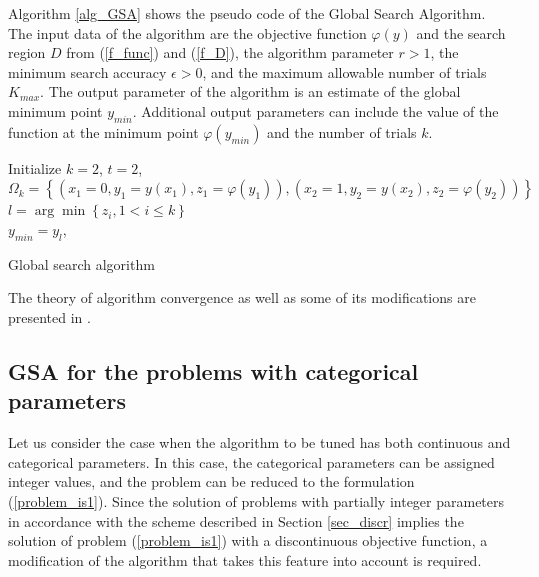 \documentclass[preprint,12pt]{elsarticle}
\begin{document}
Algorithm \ref{alg_GSA} shows the pseudo code of the Global Search Algorithm. The input data of the algorithm are the objective function $\varphi(y)$ and the search region $D$ from (\ref{f_func}) and (\ref{f_D}), the algorithm parameter $r>1$, the minimum search accuracy $\epsilon > 0$, and the maximum allowable number of trials $K_{max}$. The output parameter of the algorithm is an estimate of the global minimum point $y_{min}$. Additional output parameters can include the value of the function at the minimum point $\varphi(y_{min})$ and the number of trials $k$.

\begin{algorithm}
\LinesNumbered
 Initialize $k=2$, $t=2$, $\Omega_k= \left\{ (x_1=0, y_1=y(x_1), z_1=\varphi(y_1)), (x_2=1, y_2=y(x_2), z_2=\varphi(y_2)) \right\}$\\
 $l = \arg \min \left\{ z_i, 1 < i \leq k \right\}$\\
 $y_{min} = y_l$, \\ 
 \caption{Global search algorithm}\label{alg_GSA}
\end{algorithm}

The theory of algorithm convergence as well as some of its modifications are presented in \cite{Strongin2000}.

\subsection{GSA for the problems with categorical parameters}
\label{sec_mGSA}

Let us consider the case when the algorithm to be tuned has both continuous and categorical parameters.  In this case, the categorical parameters can be assigned integer values, and the problem can be reduced to the formulation (\ref{problem_is1}).
Since the solution of problems with partially integer parameters in accordance with the scheme described in Section \ref{sec_discr} implies the solution of problem (\ref{problem_is1}) with a discontinuous objective function, a modification of the algorithm that takes this feature into account is required.
\end{document}
